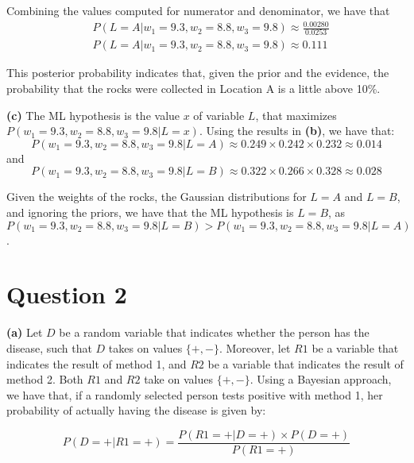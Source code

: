 \documentclass[leqno]{article}
\begin{document}
\noindent Combining the values computed for numerator and denominator, we have that
\begin{equation*}
\begin{split}
&P(L = A| w_1 = 9.3, w_2 = 8.8, w_3 = 9.8) \approx \frac{0.00280}{0.0253}
\\
&P(L = A| w_1 = 9.3, w_2 = 8.8, w_3 = 9.8) \approx 0.111
\end{split}
\end{equation*}

\noindent This posterior probability indicates that, given the prior and the evidence, the probability that the rocks were collected in Location A is a little above 10\%.

\hfill

\noindent \textbf{(c)} The ML hypothesis is the value $x$ of variable $L$, that maximizes $P(w_1 = 9.3, w_2 = 8.8, w_3 = 9.8| L = x)$. Using the results in
\textbf{(b)}, we have that:
\begin{equation*}
P(w_1 = 9.3, w_2 = 8.8, w_3 = 9.8| L = A) \approx 0.249 \times 0.242 \times 0.232 \approx 0.014
\end{equation*}
and
\begin{equation*}
P(w_1 = 9.3, w_2 = 8.8, w_3 = 9.8| L = B) \approx 0.322 \times 0.266 \times 0.328 \approx 0.028
\end{equation*}

\noindent Given the weights of the rocks, the Gaussian distributions for $L = A$ and $L = B$, and ignoring the priors, we have that
the ML hypothesis is $L = B$, as $P(w_1 = 9.3, w_2 = 8.8, w_3 = 9.8| L = B) > P(w_1 = 9.3, w_2 = 8.8, w_3 = 9.8| L = A)$.

\section*{Question 2}

\noindent \textbf{(a)} Let $D$ be a random variable that indicates whether the person has the disease,
such that $D$ takes on values $\{+, -\}$. Moreover, let $R1$ be a variable that indicates the
result of method 1, and $R2$ be a variable that indicates the result of method 2. Both $R1$ and
$R2$ take on values $\{+, -\}$. Using a Bayesian approach, we have that, if a randomly selected
person tests positive with method 1, her probability of actually having the disease is
given by:

\begin{equation*}
P(D = +|R1 = +) = \frac{P(R1 = +|D = +) \times P(D = +)}{P(R1 = +)}
\end{equation*}  
\end{document}
